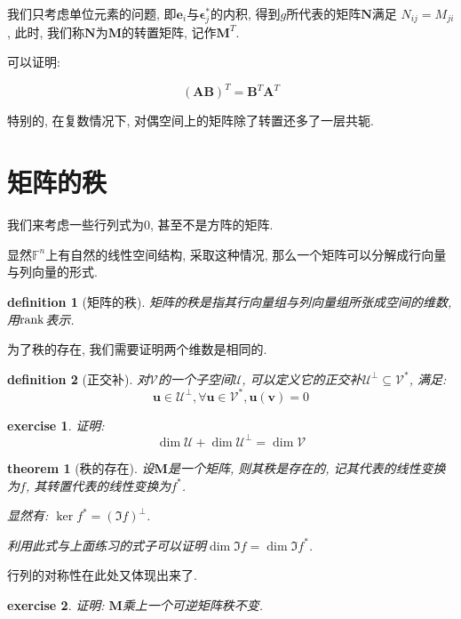 \documentclass[12pt]{ctexbook}
\newtheorem{definition}{definition}
\numberwithin{definition}{section}
\newtheorem{theorem}{theorem}
\numberwithin{theorem}{section}
\newtheorem{exercise}{exercise}
\numberwithin{exercise}{section}
\numberwithin{example}{section}
\numberwithin{lemma}{section}
\begin{document}
    我们只考虑单位元素的问题, 即\(\boldsymbol{e}_i\)与\(\boldsymbol{\epsilon}^*_j\)的内积, 得到\(g\)所代表的矩阵\(\mathbf{N}\)满足
    \(N_{ij} = M_{ji}\), 此时, 我们称\(\mathbf{N}\)为\(\mathbf{M}\)的转置矩阵, 记作\(\mathbf{M}^T\).

    可以证明:

    \begin{equation}
        {(\mathbf{A} \mathbf{B})}^T = \mathbf{B}^T \mathbf{A}^T
    \end{equation}

    特别的, 在复数情况下, 对偶空间上的矩阵除了转置还多了一层共轭.

    \section{矩阵的秩}

    我们来考虑一些行列式为\(0\), 甚至不是方阵的矩阵.

    显然\(\mathbb{F}^n\)上有自然的线性空间结构, 采取这种情况, 那么一个矩阵可以分解成行向量与列向量的形式.

    \begin{definition}
        [矩阵的秩] 矩阵的秩是指其行向量组与列向量组所张成空间的维数, 用\(\rank\)表示.
    \end{definition}

    为了秩的存在, 我们需要证明两个维数是相同的.

    \begin{definition}
        [正交补] 对\(\mathcal{V}\)的一个子空间\(\mathcal{U}\), 可以定义它的正交补\(\mathcal{U}^\bot \subseteq \mathcal{V}^*\), 
        满足:
        \begin{equation}
            \boldsymbol{u} \in \mathcal{U}^\bot, \forall \boldsymbol{u} \in \mathcal{V}^*, \boldsymbol{u} (\boldsymbol{v}) = 0
        \end{equation}
    \end{definition}

    \begin{exercise}
        证明:
        \begin{equation}
            \dim \mathcal{U} + \dim \mathcal{U}^\bot = \dim \mathcal{V}
        \end{equation}
    \end{exercise}

    \begin{theorem}
        [秩的存在] 设\(\mathbf{M}\)是一个矩阵, 则其秩是存在的, 记其代表的线性变换为\(f\), 其转置代表的线性变换为\(f^*\).
        
        显然有: \(\ker f^* = {(\Im f)}^\bot\).

        利用此式与上面练习的式子可以证明\(\dim \Im f = \dim \Im f^*\).
    \end{theorem}

    行列的对称性在此处又体现出来了.

    \begin{exercise}
        证明: \(\mathbf{M}\)乘上一个可逆矩阵秩不变.
    \end{exercise}
\end{document}
